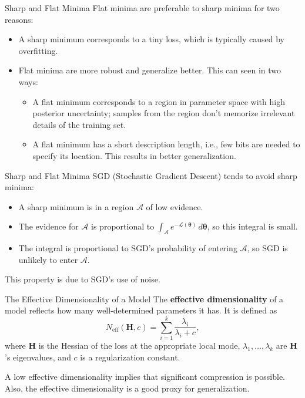 \documentclass{beamer}
\begin{document}
\begin{frame}{Sharp and Flat Minima}
    Flat minima are preferable to sharp minima for two reasons:
    \begin{itemize}
        \item A sharp minimum corresponds to a tiny loss, which is typically caused by overfitting.
        \item Flat minima are more robust and generalize better. This can seen in two ways:
            \begin{itemize}
                \item A flat minimum corresponds to a region in parameter space with high posterior uncertainty; samples from the region don't memorize irrelevant details of the training set.
                \item A flat minimum has a short description length, i.e., few bits are needed to specify its location. This results in better generalization.
            \end{itemize}
    \end{itemize}
\end{frame}

\begin{frame}{Sharp and Flat Minima}
    SGD (Stochastic Gradient Descent) tends to avoid sharp minima:
    \begin{itemize}
        \item A sharp minimum is in a region $\mathcal{A}$ of low evidence.
        \item The evidence for $\mathcal{A}$ is proportional to $\int_{\mathcal{A}} e^{-\mathcal{L}(\boldsymbol{\theta})}\,d\boldsymbol{\theta}$, so this integral is small.
        \item The integral is proportional to SGD's probability of entering $\mathcal{A}$, so SGD is unlikely to enter $\mathcal{A}$.
    \end{itemize}
    This property is due to SGD's use of noise.
\end{frame}

\begin{frame}{The Effective Dimensionality of a Model}
    The \textbf{effective dimensionality} of a model reflects how many well-determined parameters it has. It is defined as
    \begin{equation*}
        N_{\text{eff}}(\boldsymbol{H}, c) = \sum_{i = 1}^k \frac{\lambda_i}{\lambda_i + c},
    \end{equation*}
    where $\boldsymbol{H}$ is the Hessian of the loss at the appropriate local mode, $\lambda_1, \ldots, \lambda_k$ are $\boldsymbol{H}$'s eigenvalues, and $c$ is a regularization constant.
    
    \medskip
    
    A low effective dimensionality implies that significant compression is possible. Also, the effective dimensionality is a good proxy for generalization.
\end{frame}
\end{document}
